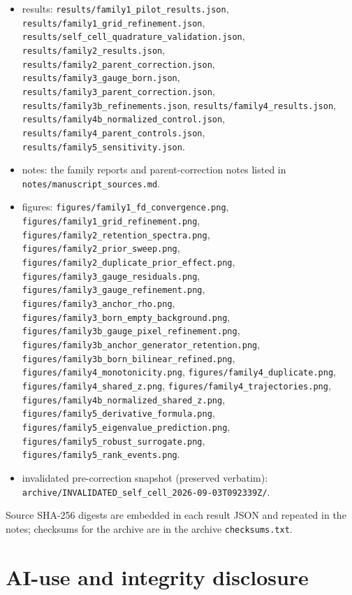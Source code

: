 \documentclass[12pt]{article}
\begin{document}
\begin{itemize}
\item results: \texttt{results/family1\_pilot\_results.json},
\texttt{results/family1\_grid\_refinement.json},
\texttt{results/self\_cell\_quadrature\_validation.json},
\texttt{results/family2\_results.json}, \texttt{results/family2\_parent\_correction.json},
\texttt{results/family3\_gauge\_born.json}, \texttt{results/family3\_parent\_correction.json},
\texttt{results/family3b\_refinements.json}, \texttt{results/family4\_results.json},
\texttt{results/family4b\_normalized\_control.json},
\texttt{results/family4\_parent\_controls.json}, \texttt{results/family5\_sensitivity.json}.
\item notes: the family reports and parent-correction notes listed in
\texttt{notes/manuscript\_sources.md}.
\item figures: \texttt{figures/family1\_fd\_convergence.png},
\texttt{figures/family1\_grid\_refinement.png},
\texttt{figures/family2\_retention\_spectra.png},
\texttt{figures/family2\_prior\_sweep.png}, \texttt{figures/family2\_duplicate\_prior\_effect.png},
\texttt{figures/family3\_gauge\_residuals.png}, \texttt{figures/family3\_gauge\_refinement.png},
\texttt{figures/family3\_anchor\_rho.png}, \texttt{figures/family3\_born\_empty\_background.png},
\texttt{figures/family3b\_gauge\_pixel\_refinement.png},
\texttt{figures/family3b\_anchor\_generator\_retention.png},
\texttt{figures/family3b\_born\_bilinear\_refined.png},
\texttt{figures/family4\_monotonicity.png}, \texttt{figures/family4\_duplicate.png},
\texttt{figures/family4\_shared\_z.png}, \texttt{figures/family4\_trajectories.png},
\texttt{figures/family4b\_normalized\_shared\_z.png},
\texttt{figures/family5\_derivative\_formula.png},
\texttt{figures/family5\_eigenvalue\_prediction.png},
\texttt{figures/family5\_robust\_surrogate.png}, \texttt{figures/family5\_rank\_events.png}.
\item invalidated pre-correction snapshot (preserved verbatim):
\texttt{archive/INVALIDATED\_self\_cell\_2026-09-03T092339Z/}.
\end{itemize}
Source SHA-256 digests are embedded in each result JSON and repeated in the
notes; checksums for the archive are in the archive \texttt{checksums.txt}.

\section{AI-use and integrity disclosure}\label{sec:ai}
\end{document}

